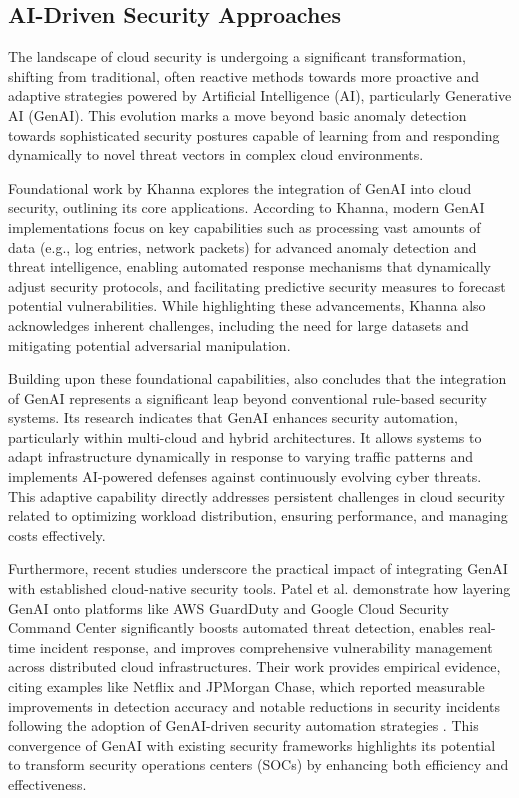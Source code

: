 
\subsection{AI-Driven Security Approaches} %
\label{sec:AI-Driven Security Approaches}

The landscape of cloud security is undergoing a significant transformation, shifting from traditional, often reactive methods towards more proactive and adaptive strategies powered by Artificial Intelligence (AI), particularly Generative AI (GenAI). This evolution marks a move beyond basic anomaly detection towards sophisticated security postures capable of learning from and responding dynamically to novel threat vectors in complex cloud environments.

Foundational work by Khanna \cite{khanna_enhancing_2024} explores the integration of GenAI into cloud security, outlining its core applications. According to Khanna, modern GenAI implementations focus on key capabilities such as processing vast amounts of data (e.g., log entries, network packets) for advanced anomaly detection and threat intelligence, enabling automated response mechanisms that dynamically adjust security protocols, and facilitating predictive security measures to forecast potential vulnerabilities. While highlighting these advancements, Khanna also acknowledges inherent challenges, including the need for large datasets and mitigating potential adversarial manipulation.

Building upon these foundational capabilities, \cite{seth_ai_2025} also concludes that the integration of GenAI represents a significant leap beyond conventional rule-based security systems. Its research indicates that GenAI enhances security automation, particularly within multi-cloud and hybrid architectures. It allows systems to adapt infrastructure dynamically in response to varying traffic patterns and implements AI-powered defenses against continuously evolving cyber threats. This adaptive capability directly addresses persistent challenges in cloud security related to optimizing workload distribution, ensuring performance, and managing costs effectively.

Furthermore, recent studies underscore the practical impact of integrating GenAI with established cloud-native security tools. Patel et al. \cite{patel_generative_2025} demonstrate how layering GenAI onto platforms like AWS GuardDuty and Google Cloud Security Command Center significantly boosts automated threat detection, enables real-time incident response, and improves comprehensive vulnerability management across distributed cloud infrastructures. Their work provides empirical evidence, citing examples like Netflix and JPMorgan Chase, which reported measurable improvements in detection accuracy and notable reductions in security incidents following the adoption of GenAI-driven security automation strategies \cite{patel_generative_2025}. This convergence of GenAI with existing security frameworks highlights its potential to transform security operations centers (SOCs) by enhancing both efficiency and effectiveness.

